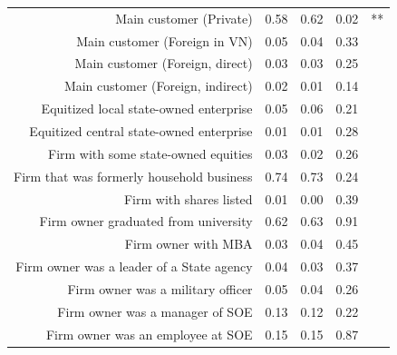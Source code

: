 \documentclass{beamer}
\begin{document}
\begin{frame}
\begin{columns}[T]
\begin{column}{.48\textwidth}
{\begin{tabular}{rrrrl}
  Main customer (Private) & 0.58 & 0.62 & 0.02 & ** \\ 
  Main customer (Foreign in VN) & 0.05 & 0.04 & 0.33 &  \\ 
  Main customer (Foreign, direct) & 0.03 & 0.03 & 0.25 &  \\ 
  Main customer (Foreign, indirect) & 0.02 & 0.01 & 0.14 &  \\ 
  Equitized local state-owned enterprise & 0.05 & 0.06 & 0.21 &  \\ 
  Equitized central state-owned enterprise & 0.01 & 0.01 & 0.28 &  \\ 
  Firm with some state-owned equities & 0.03 & 0.02 & 0.26 &  \\ 
  Firm that was formerly household business & 0.74 & 0.73 & 0.24 &  \\ 
  Firm with shares listed & 0.01 & 0.00 & 0.39 &  \\ 
  Firm owner graduated from university & 0.62 & 0.63 & 0.91 &  \\ 
  Firm owner with MBA & 0.03 & 0.04 & 0.45 &  \\ 
  Firm owner was a leader of a State agency & 0.04 & 0.03 & 0.37 &  \\ 
  Firm owner was a military officer & 0.05 & 0.04 & 0.26 &  \\ 
  Firm owner was a manager of SOE & 0.13 & 0.12 & 0.22 &  \\ 
  Firm owner was an employee at SOE & 0.15 & 0.15 & 0.87 &  \\ 
   \hline
\end{tabular}       
}
\end{column}%
\begin{column}{.48\textwidth}
\end{column}
\end{columns}
\end{frame}
\end{document}
